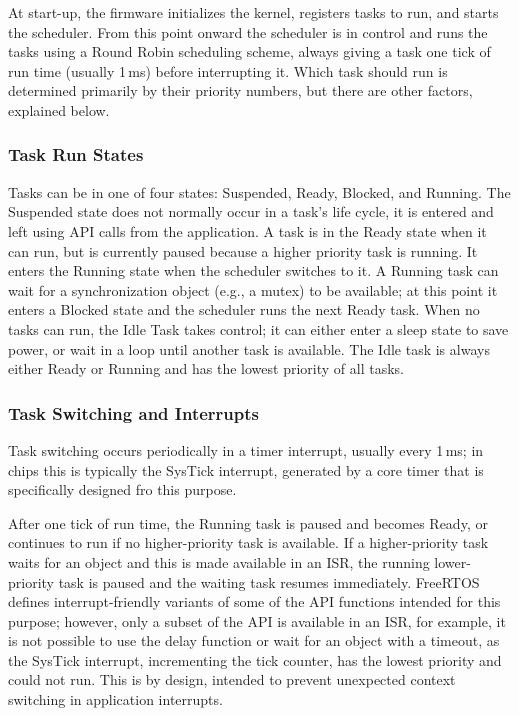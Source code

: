 At start-up, the firmware initializes the kernel, registers tasks to run, and starts the scheduler. From this point onward the scheduler is in control and runs the tasks using a Round Robin scheduling scheme, always giving a task one tick of run time (usually 1\,ms) before interrupting it. Which task should run is determined primarily by their priority numbers, but there are other factors, explained below.

\subsubsection{Task Run States}

Tasks can be in one of four states: Suspended, Ready, Blocked, and Running. The Suspended state does not normally occur in a task's life cycle, it is entered and left using \gls{API} calls from the application. A task is in the Ready state when it can run, but is currently paused because a higher priority task is running. It enters the Running state when the scheduler switches to it. A Running task can wait for a synchronization object (e.g., a mutex) to be available; at this point it enters a Blocked state and the scheduler runs the next Ready task. When no tasks can run, the Idle Task takes control; it can either enter a sleep state to save power, or wait in a loop until another task is available. The Idle task is always either Ready or Running and has the lowest priority of all tasks.

\subsubsection{Task Switching and Interrupts}

Task switching occurs periodically in a timer interrupt, usually every 1\,ms; in \armcm chips this is typically the SysTick interrupt, generated by a core timer that is specifically designed fro this purpose.

After one tick of run time, the Running task is paused and becomes Ready, or continues to run if no higher-priority task is available. If a higher-priority task waits for an object and this is made available in an \gls{ISR}, the running lower-priority task is paused and the waiting task resumes immediately. FreeRTOS defines interrupt-friendly variants of some of the \gls{API} functions intended for this purpose; however, only a subset of the \gls{API} is available in an \gls{ISR}, for example, it is not possible to use the delay function or wait for an object with a timeout, as the SysTick interrupt, incrementing the tick counter, has the lowest priority and could not run. This is by design, intended to prevent unexpected context switching in application interrupts.

